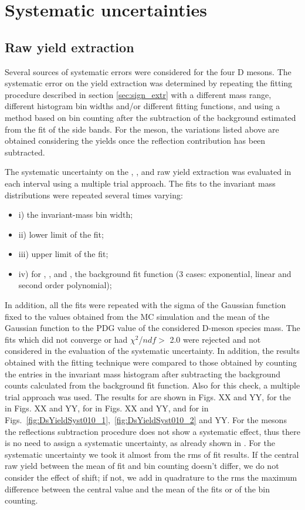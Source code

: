 \clearpage
\section{Systematic uncertainties}

\subsection{Raw yield extraction}
\label{sec:raw_yield_syst}
Several sources of systematic errors were considered for the four D mesons. The systematic error on the yield extraction was determined by repeating the fitting procedure described in section \ref{sec:sign_extr} with a different mass range, different histogram bin widths and/or different fitting functions, and using a method based on bin counting after the subtraction of the background estimated from the fit of the side bands. For the \Dzero meson, the variations listed above are obtained considering the yields once the reflection contribution has been subtracted.

The systematic uncertainty on the \Dplus, \Dzero, \Dstar and \Dsubs raw yield extraction was evaluated in each \pt interval using a multiple trial approach. The fits to the invariant mass distributions were repeated several times varying:
\begin{itemize}
	\item i) the invariant-mass bin width;
	\item ii) lower limit of the fit;
	\item iii)  upper  limit  of  the  fit;
	\item iv) for \Dzero, \Dplus, and \Dsubs, the background fit function (3 cases: exponential, linear and second order polynomial);
\end{itemize}   
In addition, all the fits were repeated with the sigma of the Gaussian function fixed to the values obtained from the MC simulation and the mean of the Gaussian function to the PDG value of the considered D-meson species mass. The fits which did not converge or had $\chi^2$/$ndf> $ 2.0 were rejected and not considered in the evaluation of the systematic uncertainty.  In addition, the results obtained with the fitting technique were compared to those obtained by counting the entries in the invariant mass histogram after subtracting the background counts calculated from the background fit function. Also for this check, a multiple trial approach was used. 
The results for \Dplus are shown in Figs. XX and YY, for the \Dzero in Figs. XX and YY, for \Dstar in Figs. XX and YY, and for \Dsubs in Figs.~\ref{fig:DsYieldSyst010_1},~\ref{fig:DsYieldSyst010_2} and YY.
For the \Dzero mesons the reflections subtraction procedure does not show a systematic effect, thus there is no need to assign a systematic uncertainty, as already shown in \cite{Bruna:2016mgn}. For the systematic uncertainty we took it almost from the rms of fit results. If the central raw yield between the mean of fit and bin counting doesn't differ, we do not consider the effect of shift; if not, we add in quadrature to the rms the maximum difference between the central value and the mean of the fits or of the bin counting.



